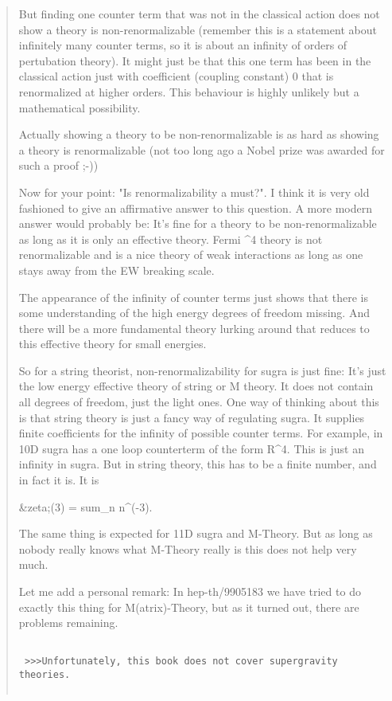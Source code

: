 \begin{quote}
But finding one counter term that was not in the classical action
does not show a theory is non-renormalizable (remember this is a
statement about infinitely many counter terms, so it is about
an infinity of orders of pertubation theory). It might just be
that this one term has been in the classical action just with coefficient
(coupling constant) 0 that is renormalized at higher orders. This
behaviour is highly unlikely but a mathematical possibility.

Actually showing a theory to be non-renormalizable is as hard
as showing a theory is renormalizable (not too long ago a 
Nobel prize was awarded for such a proof ;-))

Now for your point: "Is renormalizability a must?". I think it
is very old fashioned to give an affirmative answer to this 
question. A more modern answer would probably be: It's fine
for a theory to be non-renormalizable as long as it is only
an effective theory. Fermi \psi ^4 theory is not renormalizable
and is a nice theory of weak interactions as long as one
stays away from the EW breaking scale.

The appearance of the infinity of counter terms just shows
that there is some understanding of the high energy degrees
of freedom missing. And there will be a more fundamental
theory lurking around that reduces to this effective
theory for small energies.

So for a string theorist, non-renormalizability for sugra
is just fine: It's just the low energy effective theory
of string or M theory. It does not contain all degrees
of freedom, just the light ones. One way of thinking about
this is that string theory is just a fancy way of regulating
sugra. It supplies finite coefficients for the infinity
of possible counter terms. For example, in 10D sugra has
a one loop counterterm of the form R^4. This is just
an infinity in sugra. But in string theory, this has to be
a finite number, and in fact it is. It is

&zeta;(3) = sum_n n^(-3).

The same thing is expected for 11D sugra and M-Theory. But
as long as nobody really knows what M-Theory really is this
does not help very much. 

Let me add a personal remark: In hep-th/9905183 we have
tried to do exactly this thing for M(atrix)-Theory, but
as it turned out, there are problems remaining.


\begin{verbatim}

 >>>Unfortunately, this book does not cover supergravity theories.


\end{verbatim}
\end{quote}
